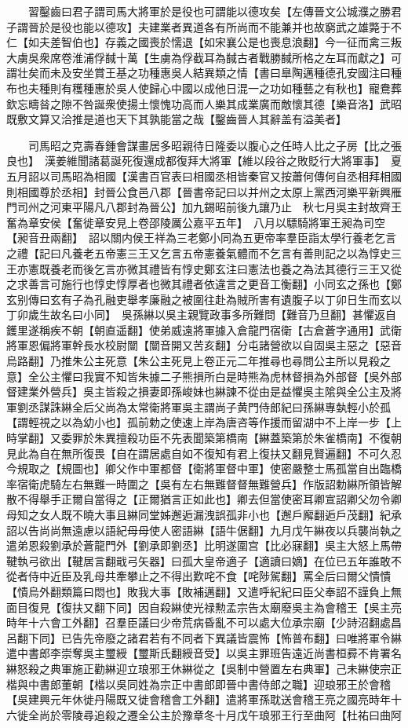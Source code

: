 　　習鑿齒曰君子謂司馬大將軍於是役也可謂能以德攻矣【左傳晉文公城濮之勝君子謂晉於是役也能以德攻】夫建業者異道各有所尚而不能兼并也故窮武之雄斃于不仁【如夫差智伯也】存義之國喪於懦退【如宋襄公是也喪息浪翻】今一征而禽三叛大虜吳衆席卷淮浦俘馘十萬【生虜為俘截耳為馘古者戰勝馘所格之左耳而獻之】可謂壮矣而未及安坐賞王基之功種惠吳人結異類之情【書曰臯陶邁種德孔安國注曰種布也夫種則有穫種惠於吳人使歸心中國以成他日混一之功如種藝之有秋也】寵鴦葬欽忘疇㫺之隙不咎誕衆使揚土懷愧功高而人樂其成業廣而敵懷其德【樂音洛】武昭既敷文算又洽推是道也天下其孰能當之哉【鑿齒晉人其辭盖有溢美者】

　　司馬昭之克壽春鍾會謀畫居多昭親待日隆委以腹心之任時人比之子房【比之張良也】　漢姜維聞諸葛誕死復還成都復拜大將軍【維以段谷之敗貶行大將軍事】　夏五月詔以司馬昭為相國【漢書百官表曰相國丞相皆秦官又按蕭何傳何自丞相拜相國則相國尊於丞相】封晉公食邑八郡【晉書帝記曰以并州之太原上黨西河樂平新興雁門司州之河東平陽凡八郡封為晉公】加九錫昭前後九讓乃止　秋七月吳主封故齊王奮為章安侯【奮徙章安見上卷邵陵厲公嘉平五年】　八月以驃騎將軍王昶為司空【昶音丑兩翻】　詔以關内侯王祥為三老鄭小同為五更帝率羣臣詣太學行養老乞言之禮【記曰凡養老五帝憲三王又乞言五帝憲養氣體而不乞言有善則記之以為惇史三王亦憲既養老而後乞言亦微其禮皆有惇史鄭玄注曰憲法也養之為法其德行三王又從之求善言可施行也惇史惇厚者也微其禮者依違言之更音工衡翻】小同玄之孫也【鄭玄别傳曰玄有子為孔融吏舉孝廉融之被圍往赴為賊所害有遺腹子以丁卯日生而玄以丁卯歲生故名曰小同】　吳孫綝以吳主親覽政事多所難問【難音乃旦翻】甚懼返自鑊里遂稱疾不朝【朝直遥翻】使弟威遠將軍據入倉龍門宿衛【古倉蒼字通用】武衛將軍恩偏將軍幹長水校尉闓【闓音開又苦亥翻】分屯諸營欲以自固吳主惡之【惡音烏路翻】乃推朱公主死意【朱公主死見上卷正元二年推尋也尋問公主所以見殺之意】全公主懼曰我實不知皆朱據二子熊損所白是時熊為虎林督損為外部督【吳外部督建業外營兵】吳主皆殺之損妻即孫峻妹也綝諫不從由是益懼吳主隂與全公主及將軍劉丞謀誅綝全后父尚為太常衛將軍吳主謂尚子黄門侍郎紀曰孫綝專埶輕小於孤【謂輕視之以為幼小也】孤前勅之使速上岸為唐咨等作援而留湖中不上岸一步【上時掌翻】又委罪於朱異擅殺功臣不先表聞築第橋南【綝蓋築第於朱雀橋南】不復朝見此為自在無所復畏【自在謂居處自如不復知有君上復扶又翻見賢遍翻】不可久忍今規取之【規圖也】卿父作中軍都督【衛將軍督中軍】使密嚴整士馬孤當自出臨橋率宿衛虎騎左右無難一時圍之【吳有左右無難督督無難營兵】作版詔勅綝所領皆解散不得舉手正爾自當得之【正爾猶言正如此也】卿去但當使密耳卿宣詔卿父勿令卿母知之女人既不曉大事且綝同堂姊邂逅漏洩誤孤非小也【邂戶廨翻逅戶茂翻】紀承詔以告尚尚無遠慮以語紀母母使人密語綝【語牛倨翻】九月戊午綝夜以兵襲尚執之遣弟恩殺劉承於蒼龍門外【劉承即劉丞】比明遂圍宫【比必寐翻】吳主大怒上馬帶鞬執弓欲出【鞬居言翻戢弓矢器】曰孤大皇帝適子【適讀曰嫡】在位已五年誰敢不從者侍中近臣及乳母共牽攀止之不得出歎咤不食【咤陟駕翻】罵全后曰爾父憒憒【憒烏外翻類篇曰悶也】敗我大事【敗補邁翻】又遣呼紀紀曰臣父奉詔不謹負上無面目復見【復扶又翻下同】因自殺綝使光禄勲孟宗告太廟廢吳主為會稽王【吳主亮時年十六會工外翻】召羣臣議曰少帝荒病昏亂不可以處大位承宗廟【少詩沼翻處昌呂翻下同】已告先帝廢之諸君若有不同者下異議皆震怖【怖普布翻】曰唯將軍令綝遣中書郎李崇奪吳主璽綬【璽斯氏翻綬音受】以吳主罪班告遠近尚書桓彛不肯署名綝怒殺之典軍施正勸綝迎立琅邪王休綝從之【吳制中營置左右典軍】己未綝使宗正楷與中書郎董朝【楷以吳同姓為宗正中書郎即晉中書侍郎之職】迎琅邪王於會稽【吳建興元年休徙丹陽既又徙會稽會工外翻】遣將軍孫耽送會稽王亮之國亮時年十六徙全尚於零陵尋追殺之遷全公主於豫章冬十月戊午琅邪王行至曲阿【杜祐曰曲阿